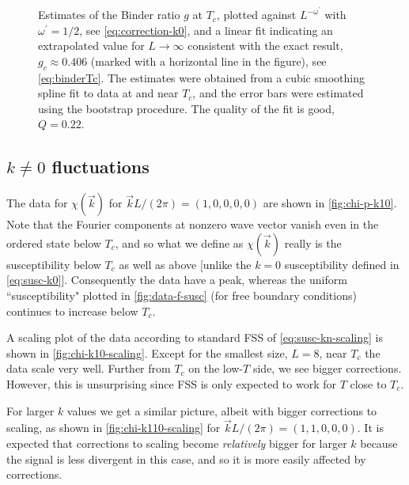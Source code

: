 \begin{figure}
  \centering
  
  \caption[
    Data for the Binder ratio $g$ at the transition temperature $T_c$ for the
    five-dimensional Ising model with periodic boundary conditions.
  ]
  {
    Estimates of the Binder ratio $g$ at $T_c$, plotted against
    $L^{-\omega^{\prime}}$ with $\omega^{\prime}=1/2$, see
    \cref{eq:correction-k0}, and a linear fit indicating an extrapolated
    value for $L\to\infty$ consistent with the exact result, $g_c \approx
    0.406$ (marked with a horizontal line in the figure), see
    \cref{eq:binderTc}. The estimates were obtained from a cubic smoothing
    spline fit to data at and near $T_c$, and the error bars were estimated
    using the bootstrap procedure. The quality of the fit is good, $Q=0.22$.
  } \label{fig:gx}
\end{figure}


\subsection{$k \neq 0$ fluctuations}

The data for $\chi(\vec{k})$ for $\vec{k}L/(2\pi)=(1,0,0,0,0)$ are shown in
\cref{fig:chi-p-k10}. Note that the Fourier components at nonzero wave vector
vanish even in the ordered state below $T_c$, and so what we define as
$\chi(\vec{k})$ really is the susceptibility below $T_c$ as well as above
[unlike the $k=0$ susceptibility defined in \cref{eq:susc-k0}]. Consequently
the data have a peak, whereas the uniform ``susceptibility" plotted in
\cref{fig:data-f-susc} (for free boundary conditions) continues to increase
below $T_c$.

A scaling plot of the data according to standard FSS of
\cref{eq:susc-kn-scaling} is shown in \cref{fig:chi-k10-scaling}. Except for
the smallest size, $L=8$, near $T_c$ the data scale very well. Further from
$T_c$ on the low-$T$ side, we see bigger corrections. However, this is
unsurprising since FSS is only expected to work for $T$ close to $T_c$.

For larger $k$ values we get a similar picture, albeit with bigger corrections
to scaling, as shown in \cref{fig:chi-k110-scaling} for
$\vec{k}L/(2\pi)=(1,1,0,0,0)$. It is expected that corrections to scaling
become \emph{relatively} bigger for larger $k$ because the signal is less
divergent in this case, and so it is more easily affected by corrections.

